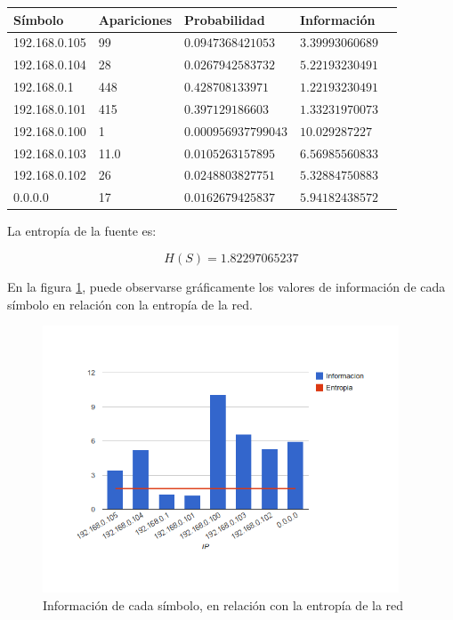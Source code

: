 \documentclass{article}
\begin{document}
\vskip10pt

\begin{tabular}{|l|l|l|l|l|}
  \hline
  Símbolo & Apariciones & Probabilidad & Información \\
  \hline
  192.168.0.105 & 99 & $0.0947368421053$ & $3.39993060689$ \\
  \hline
  192.168.0.104 & 28 & $0.0267942583732$ & $5.22193230491$ \\
  \hline
  192.168.0.1 & 448 & $0.428708133971$ & $1.22193230491$ \\
  \hline
  192.168.0.101 & 415 & $0.397129186603$  & $1.33231970073$ \\
  \hline
  192.168.0.100 & 1 & $0.000956937799043$ & $10.029287227$ \\
  \hline
  192.168.0.103 & 11.0 & $0.0105263157895$ & $6.56985560833$ \\
  \hline
  192.168.0.102 & 26 & $0.0248803827751$ & $5.32884750883$ \\
  \hline
  0.0.0.0 & 17 & $0.0162679425837$ & $5.94182438572$ \\
  \hline
\end{tabular}

\vskip10pt

La entropía de la fuente es:

$$H(S) = 1.82297065237$$

En la figura \ref{fig:red1requesters:infoentro}, puede observarse gráficamente
los valores de información de cada símbolo en relación con la entropía de la
red.

\begin{figure}[h!]
    \centering                                                       
    \includegraphics[width=300pt]{consultas1.png}
    \caption{Información de cada símbolo, en relación con la
        entropía de la red}
    \label{fig:red1requesters:infoentro}
\end{figure}
\end{document}
